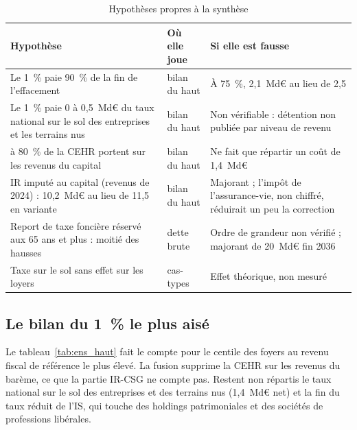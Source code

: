 \begin{table}[!htbp]\centering\scriptsize
\caption{Hypothèses propres à la synthèse}\label{tab:meth_hyp}
\begin{tabularx}{\linewidth}{@{}>{\raggedright\arraybackslash}p{5.2cm}>{\raggedright\arraybackslash}p{2.2cm}>{\raggedright\arraybackslash}X@{}}
\toprule
Hypothèse & Où elle joue & Si elle est fausse \\
\midrule
Le 1~\% paie 90~\% de la fin de l'effacement & bilan du haut & À 75~\%, 2,1~Md€ au lieu de 2,5 \\
Le 1~\% paie 0 à 0,5~Md€ du taux national sur le sol des entreprises et les terrains nus & bilan du haut & Non vérifiable :
détention non publiée par niveau de revenu \\
50 à 80~\% de la CEHR portent sur les revenus du capital & bilan du haut & Ne fait que répartir un coût de 1,4~Md€ \\
IR imputé au capital (revenus de 2024) : 10,2~Md€ au lieu de 11,5 en variante & bilan du haut & Majorant ; l'impôt de
l'assurance-vie, non chiffré, réduirait un peu la correction \\
Report de taxe foncière réservé aux 65 ans et plus : moitié des hausses & dette brute & Ordre de grandeur non vérifié ;
majorant de 20~Md€ fin 2036 \\
Taxe sur le sol sans effet sur les loyers & cas-types & Effet théorique, non mesuré \\
\bottomrule
\end{tabularx}
\end{table}

\subsection{Le bilan du 1~\% le plus aisé}\label{ann:meth_haut}

Le tableau~\ref{tab:ens_haut} fait le compte pour le centile des foyers au revenu fiscal de référence le plus élevé.
La fusion supprime la CEHR sur les revenus du barème, ce que la partie IR-CSG ne compte pas. Restent non répartis le
taux national sur le sol des entreprises et des terrains nus (1,4~Md€ net) et la fin du taux réduit de l'IS, qui touche
des holdings patrimoniales et des sociétés de professions libérales.

